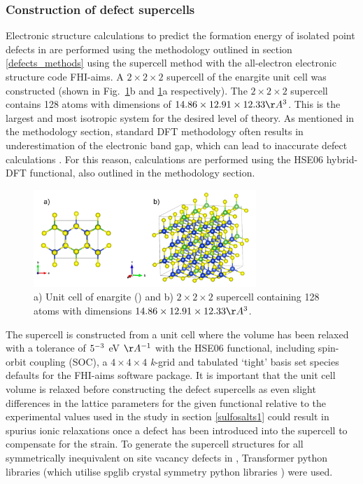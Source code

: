 \documentclass[11pt, twoside]{report}
\begin{document}
\subsubsection{Construction of defect supercells}

Electronic structure calculations to predict the formation energy of isolated point defects in {\enargite} are performed using the methodology outlined in section \ref{defects_methods} using the supercell method with the all-electron electronic structure code FHI-aims. A $2\times2\times2$ supercell of the enargite unit cell was constructed (shown in Fig.~\ref{enargite_supercell}b and \ref{enargite_supercell}a respectively). The $2\times2\times2$ supercell contains 128 atoms with dimensions of $14.86\times12.91\times12.33 \AA^3$. This is the largest and most isotropic system for the desired level of theory. As mentioned in the methodology section, standard DFT methodology often results in underestimation of the electronic band gap, which can lead to inaccurate defect calculations \cite{Lany_defects, hybrids_defect_calcs}. For this reason, calculations are performed using the HSE06 hybrid-DFT functional, also outlined in the methodology section.

\begin{figure}[h!]
    \centering
    \includegraphics[width=0.75\textwidth]{figures/enargite_supercell.png}
    \caption{a) Unit cell of enargite ({\enargite}) and b) $2\times2\times2$ supercell containing 128 atoms with dimensions $14.86\times12.91\times12.33 \AA^3$.}
    \label{enargite_supercell}
\end{figure}

The supercell is constructed from a unit cell where the volume has been relaxed with a tolerance of $5\time10^{-3}$ eV $\AA^{-1}$ with the HSE06 functional, including spin-orbit coupling (SOC), a $4\times4\times4$ \textit{k}-grid and tabulated `tight' basis set species defaults for the FHI-aims software package. It is important that the unit cell volume is relaxed before constructing the defect supercells as even slight differences in the lattice parameters for the given functional relative to the experimental values used in the study in section \ref{sulfosalts1} could result in spurius ionic relaxations once a defect has been introduced into the supercell to compensate for the strain. To generate the supercell structures for all symmetrically inequivalent on site vacancy defects in {\enargite}, Transformer python libraries \cite{Transformer} (which utilise spglib crystal symmetry python libraries \cite{spglib}) were used.
\end{document}
